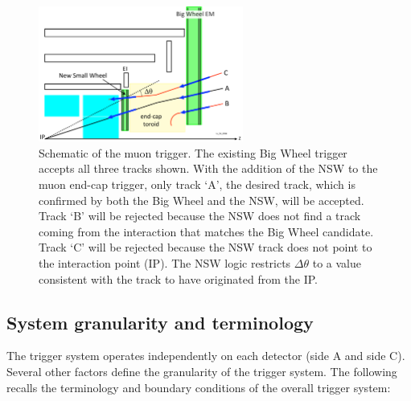 \begin{figure}[htb]
  \centering
  \includegraphics[width=0.6\textwidth]{figures/LL_SV_NSW.pdf}
  \caption{\small Schematic of the muon \endcap trigger. The existing Big Wheel trigger accepts all three tracks shown. With the addition of the NSW to the muon end-cap trigger, only track `A', the desired track, which is confirmed by both the Big Wheel and the NSW, will be accepted. Track `B' will be rejected because the NSW does not find a track coming from the interaction that matches the Big Wheel candidate. Track `C' will be rejected because the NSW track does not point to the interaction point (IP).
  The NSW logic restricts $\Delta\theta$ to a value consistent with the track to have originated from the IP.}
  \label{fig:NSW-Z}
\end{figure}


\subsection{System granularity and terminology}
\label{sec:SystemLayout}

The \endcap trigger system operates independently on each detector \endcap (side A and side C).
Several other factors define the granularity of the \endcap trigger system.
The following recalls the terminology and boundary conditions of the overall \endcap trigger system:

